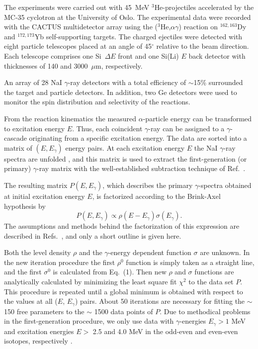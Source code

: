 The experiments were carried out with 45~MeV $^3$He-projectiles accelerated by the MC-35 cyclotron at the University of Oslo. The experimental data were recorded with the CACTUS multidetector array \cite{12} using the ($^3$He,$\alpha \gamma$) reaction on $^{162,163}$Dy and $^{172,173}$Yb self-supporting targets. The charged ejectiles were detected with eight particle telescopes placed at an angle of 45$^{\circ}$ relative to the beam direction. Each telescope comprises one Si~$\Delta E$ front and one Si(Li) $E$ back detector with thicknesses of 140 and 3000~$\mu$m, respectively. 

An array of 28 NaI $\gamma$-ray detectors with a total efficiency of $\sim$15\% surrounded the target and particle detectors. In addition, two Ge detectors were used to monitor the spin distribution and selectivity of the reactions.

From the reaction kinematics the measured $\alpha$-particle energy can be transformed to excitation energy $E$. Thus, each coincident $\gamma$-ray can be assigned to a $\gamma$-cascade originating from a specific excitation energy. The data are sorted into a matrix of $(E,E_{\gamma})$ energy pairs. At each excitation energy $E$ the NaI $\gamma$-ray spectra are unfolded \cite{13}, and this matrix is used to extract the first-generation (or primary) $\gamma$-ray matrix with the well-established subtraction technique of Ref.~\cite{14}. 

The resulting matrix $P(E,E_{\gamma})$, which describes the primary $\gamma$-spectra obtained at initial excitation energy $E$, is factorized according to the Brink-Axel hypothesis \cite{15,16} by 
\begin{equation}
P(E,E_{\gamma}) \propto \rho (E -E_{\gamma})\sigma (E_{\gamma}) . 
\end{equation}
The assumptions and methods behind the factorization of this expression are described in Refs.~\cite{11,17}, and only a short outline is given here.

Both the level density $\rho$ and the $\gamma$-energy dependent function $\sigma$ are unknown. In the new iteration procedure \cite{17} the first $\rho^0$ function is simply taken as a straight line, and the first $\sigma^0$ is calculated from Eq.~(1). Then new $\rho$ and $\sigma$ functions are analytically calculated by minimizing the least square fit $\chi ^2$ to the data set $P$. This procedure is repeated until a global minimum is obtained with respect to the values at all ($E$, $E_{\gamma}$) pairs. About 50 iterations are necessary for fitting the $\sim$ 150 free parameters to the $\sim$ 1500 data points of $P$. Due to methodical problems in the first-generation procedure, we only use data with $\gamma$-energies $E_{\gamma}> 1$ MeV and excitation energies $E >$ 2.5 and 4.0 MeV in the odd-even and even-even isotopes, respectively \cite{17}.

